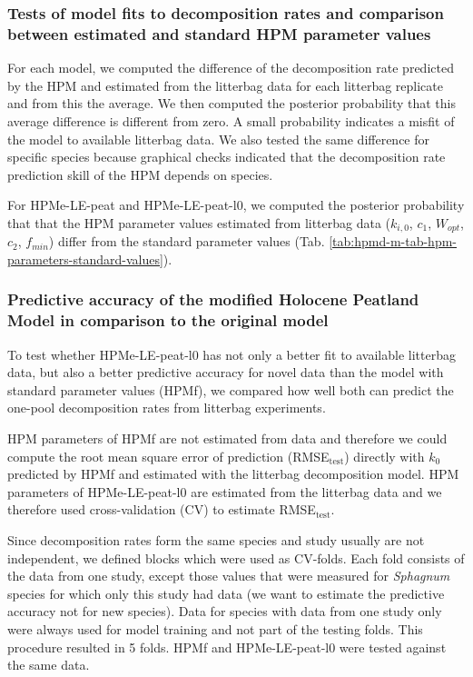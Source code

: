\documentclass[
  12pt,
]{article}
\begin{document}
\hypertarget{sdm-003-methods-9}{%
\subsubsection{Tests of model fits to decomposition rates and comparison between estimated and standard HPM parameter values}\label{sdm-003-methods-9}}

For each model, we computed the difference of the decomposition rate predicted by the HPM and estimated from the litterbag data for each litterbag replicate and from this the average. We then computed the posterior probability that this average difference is different from zero. A small probability indicates a misfit of the model to available litterbag data. We also tested the same difference for specific species because graphical checks indicated that the decomposition rate prediction skill of the HPM depends on species.

For HPMe-LE-peat and HPMe-LE-peat-l0, we computed the posterior probability that that the HPM parameter values estimated from litterbag data (\(k_{i,0}\), \(c_1\), \(W_{opt}\), \(c_2\), \(f_{min}\)) differ from the standard parameter values (Tab. \ref{tab:hpmd-m-tab-hpm-parameters-standard-values}).

\hypertarget{sdm-003-methods-11}{%
\subsubsection{Predictive accuracy of the modified Holocene Peatland Model in comparison to the original model}\label{sdm-003-methods-11}}

To test whether HPMe-LE-peat-l0 has not only a better fit to available litterbag data, but also a better predictive accuracy for novel data than the model with standard parameter values (HPMf), we compared how well both can predict the one-pool decomposition rates from litterbag experiments.

HPM parameters of HPMf are not estimated from data and therefore we could compute the root mean square error of prediction (RMSE\(_\text{test}\)) directly with \(k_0\) predicted by HPMf and estimated with the litterbag decomposition model. HPM parameters of HPMe-LE-peat-l0 are estimated from the litterbag data and we therefore used cross-validation (CV) to estimate RMSE\(_\text{test}\).

Since decomposition rates form the same species and study usually are not independent, we defined blocks which were used as CV-folds. Each fold consists of the data from one study, except those values that were measured for \emph{Sphagnum} species for which only this study had data (we want to estimate the predictive accuracy not for new species). Data for species with data from one study only were always used for model training and not part of the testing folds. This procedure resulted in 5 folds. HPMf and HPMe-LE-peat-l0 were tested against the same data.
\end{document}
